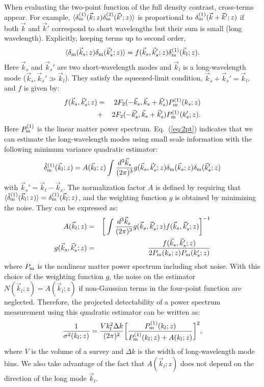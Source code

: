 \documentclass[prd,amsmath,amssymb,floatfix,superscriptaddress,nofootinbib,twocolumn]{revtex4-1}
\def\be{\begin{equation}}
\def\ee{\end{equation}}
\def\bea{\begin{eqnarray}}
\def\eea{\end{eqnarray}}
\newcommand{\vs}{\nonumber\\}
\newcommand{\vk}{\vec{k}}
\newcommand{\ec}[1]{Eq.~(\ref{eq:#1})}
\newcommand{\eql}[1]{\label{eq:#1}}
\begin{document}
When evaluating the two-point function of the full density contrast,
cross-terms appear. For example, $\langle \delta_{\rm m}^{(1)}(\vk;z)
\delta_{\rm m}^{(2)}(\vk';z) \rangle$ is proportional to
$\delta^{(1)}_{\rm m}(\vk+\vk';z)$ if both $\vk$ and $\vk'$ correspond
to short wavelengths but their sum is small (long
wavelength). Explicitly, keeping terms up to second order, \be \langle
{\delta}_{\rm m}(\vec{k}_s;z){\delta}_{\rm m}(\vec{k}_s';z) \rangle
=f(\vec{k}_s,\vec{k}_s';z){\delta}^{(1)}_{\rm
  m}(\vec{k}_l;z). \eql{2pt} \ee Here $\vk_s$ and $\vk_s'$ are two
short-wavelength modes and $\vk_l$ is a long-wavelength mode
($\vk_s,\vk_s' \gg \vk_l$). They satisfy the squeezed-limit condition,
$\vk_s+\vk_s'=\vk_l$, and $f$ is given by: \bea
f(\vec{k}_s,\vec{k}_s';z)&=&2F_2(-\vec{k}_s,\vec{k}_s+\vec{k}_s')P_{\rm
  m}^{(1)}(k_s;z)\vs &+&2F_2(-\vec{k}_s',\vec{k}_s+\vec{k}_s')P_{\rm
  m}^{(1)}(k_s';z) .\eql{deff} \eea Here $P_{\rm m}^{(1)}$ is the
linear matter power spectrum. \ec{2pt} indicates that we can estimate
the long-wavelength modes using small scale information with the
following minimum variance quadratic estimator:
\begin{eqnarray}
\hat{\delta}^{(1)}_{\rm m}(\vec{k}_l;z)=A(\vec{k}_l;z)\int \frac{d^3 \vec{k}_s}{(2\pi)^3} g(\vec{k}_s,\vec{k}_s';z){\delta}_{\rm m}(\vec{k}_s;z){\delta}_{\rm m}(\vec{k}_s';z)\vs \eql{quadest}
\end{eqnarray} 
with $\vk_s'=\vk_l-\vk_s$. The normalization factor $A$ is defined by requiring that $\langle \hat{\delta}_{\rm m}^{(1)}(\vec{k}_l;z) \rangle={\delta}_{\rm m}^{(1)}(\vec{k}_l;z)$, and the weighting function $g$ is obtained by minimizing the noise. They can be expressed as:
\begin{eqnarray}
A(\vec{k}_l;z)&=&\bigg[\int \frac{d^3 \vec{k}_s}{(2\pi)^3} g(\vec{k}_s,\vec{k}_s';z)f(\vec{k}_s,\vec{k}_s';z)  \bigg]^{-1} \eql{a} \vs
g(\vec{k}_{s},\vec{k}_{s}';z)&=&\frac{f(\vec{k}_{s},\vec{k}_{s}';z)}{2P_{\rm m}(k_{s};z)P_{\rm m}(k_{s}';z)}
\end{eqnarray}
where $P_{\rm m}$ is the nonlinear matter power spectrum including shot noise. With this choice of the weighting function $g$, the noise on the estimator $N(\vk_l;z)=A(\vk_l;z)$ if non-Gaussian terms in the four-point function are neglected. Therefore, the projected detectability of a power spectrum measurement using this quadratic estimator can be written as:
\be
\frac{1}{\sigma^{2}(k_l;z)}=\frac{V k_l^2 \Delta k }{(2\pi)^2}\bigg[\frac{P_{\rm m}^{(1)}(k_l;z)}{P_{\rm m}^{(1)}(k_l;z)+A(k_l;z) }\bigg]^2 \eql{error},
\ee
where $V$ is the volume of a survey and $\Delta k$ is the width of long-wavelength mode bins. We also take advantage of the fact that $A(\vk_l;z)$ does not depend on the direction of the long mode $\vk_l$.
\end{document}
